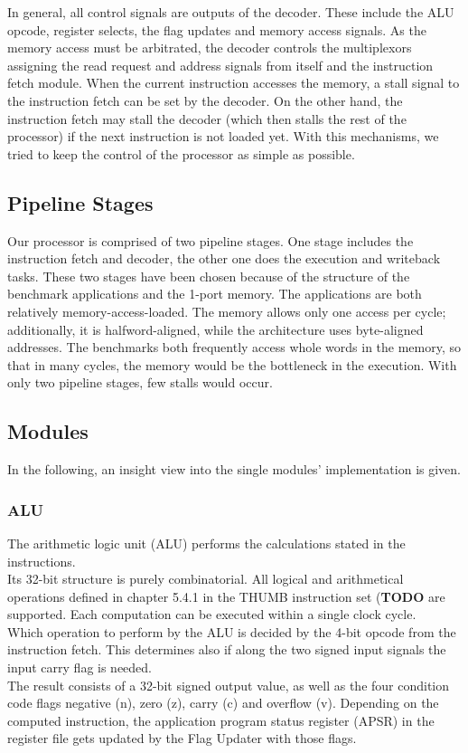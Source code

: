 In general, all control signals are outputs of the decoder. These include the ALU opcode, register selects, the flag updates and memory access signals. As the memory access must be arbitrated, the decoder controls the multiplexors assigning the read request and address signals from itself and the instruction fetch module. When the current instruction accesses the memory, a stall signal to the instruction fetch can be set by the decoder. On the other hand, the instruction fetch may stall the decoder (which then stalls the rest of the processor) if the next instruction is not loaded yet. With this mechanisms, we tried to keep the control of the processor as simple as possible.

\subsection{Pipeline Stages}
\label{subsec:pipelinestages}

Our processor is comprised of two pipeline stages. One stage includes the instruction fetch and decoder, the other one does the execution and writeback tasks. These two stages have been chosen because of the structure of the benchmark applications and the 1-port memory. The applications are both relatively memory-access-loaded. The memory allows only one access per cycle; additionally, it is halfword-aligned, while the architecture uses byte-aligned addresses. The benchmarks both frequently access whole words in the memory, so that in many cycles, the memory would be the bottleneck in the execution. With only two pipeline stages, few stalls would occur. 

\subsection{Modules}
\label{subsec:modules}
In the following, an insight view into the single modules' implementation is given.

\subsubsection{ALU}
\label{subsubsec:alu}
The arithmetic logic unit (ALU) performs the calculations stated in the instructions.\\
Its 32-bit structure is purely combinatorial. All logical and arithmetical operations defined in chapter 5.4.1 in the THUMB instruction set (\textbf{TODO} are supported. Each computation can be executed within a single clock cycle.\\
\newline
Which operation to perform by the ALU is decided by the 4-bit opcode from the instruction fetch. This determines also if along the two signed input signals the input carry flag is needed.\\
The result consists of a 32-bit signed output value, as well as the four condition code flags negative (n), zero (z), carry (c) and overflow (v). Depending on the computed instruction, the application program status register (APSR) in the register file gets updated by the Flag Updater with those flags.


